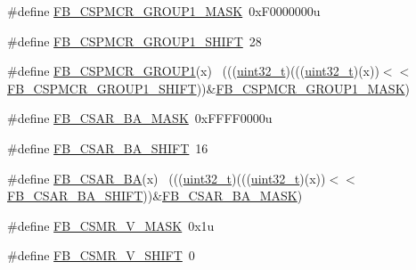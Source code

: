 \begin{DoxyCompactItemize}
\item 
\#define \hyperlink{group___f_b___register___masks_ga735fd2a0040e9ad1122a3c3fc8e28193}{F\+B\+\_\+\+C\+S\+P\+M\+C\+R\+\_\+\+G\+R\+O\+U\+P1\+\_\+\+M\+A\+SK}~0x\+F0000000u
\item 
\#define \hyperlink{group___f_b___register___masks_ga9c83850dcb3efe92a0404101e5afbdca}{F\+B\+\_\+\+C\+S\+P\+M\+C\+R\+\_\+\+G\+R\+O\+U\+P1\+\_\+\+S\+H\+I\+FT}~28
\item 
\#define \hyperlink{group___f_b___register___masks_ga9a5a66bff196c0cdfac5a0b293e5ca6a}{F\+B\+\_\+\+C\+S\+P\+M\+C\+R\+\_\+\+G\+R\+O\+U\+P1}(x)                                        ~(((\hyperlink{_p_e___types_8h_a33594304e786b158f3fb30289278f5af}{uint32\+\_\+t})(((\hyperlink{_p_e___types_8h_a33594304e786b158f3fb30289278f5af}{uint32\+\_\+t})(x))$<$$<$\hyperlink{group___f_b___register___masks_ga9c83850dcb3efe92a0404101e5afbdca}{F\+B\+\_\+\+C\+S\+P\+M\+C\+R\+\_\+\+G\+R\+O\+U\+P1\+\_\+\+S\+H\+I\+FT}))\&\hyperlink{group___f_b___register___masks_ga735fd2a0040e9ad1122a3c3fc8e28193}{F\+B\+\_\+\+C\+S\+P\+M\+C\+R\+\_\+\+G\+R\+O\+U\+P1\+\_\+\+M\+A\+SK})
\item 
\#define \hyperlink{group___f_b___register___masks_ga917335c957f6472faf91ae0b244db487}{F\+B\+\_\+\+C\+S\+A\+R\+\_\+\+B\+A\+\_\+\+M\+A\+SK}~0x\+F\+F\+F\+F0000u
\item 
\#define \hyperlink{group___f_b___register___masks_ga098f6109a1dcc8cc007bca53c312810f}{F\+B\+\_\+\+C\+S\+A\+R\+\_\+\+B\+A\+\_\+\+S\+H\+I\+FT}~16
\item 
\#define \hyperlink{group___f_b___register___masks_ga4241bb44a894dd2be2480feaf7eb2e21}{F\+B\+\_\+\+C\+S\+A\+R\+\_\+\+BA}(x)                                                    ~(((\hyperlink{_p_e___types_8h_a33594304e786b158f3fb30289278f5af}{uint32\+\_\+t})(((\hyperlink{_p_e___types_8h_a33594304e786b158f3fb30289278f5af}{uint32\+\_\+t})(x))$<$$<$\hyperlink{group___f_b___register___masks_ga098f6109a1dcc8cc007bca53c312810f}{F\+B\+\_\+\+C\+S\+A\+R\+\_\+\+B\+A\+\_\+\+S\+H\+I\+FT}))\&\hyperlink{group___f_b___register___masks_ga917335c957f6472faf91ae0b244db487}{F\+B\+\_\+\+C\+S\+A\+R\+\_\+\+B\+A\+\_\+\+M\+A\+SK})
\item 
\#define \hyperlink{group___f_b___register___masks_ga746554e800a78e64f18c333f8b3dbd2c}{F\+B\+\_\+\+C\+S\+M\+R\+\_\+\+V\+\_\+\+M\+A\+SK}~0x1u
\item 
\#define \hyperlink{group___f_b___register___masks_ga62bde86e3e74e677b6cb555c806d1dc3}{F\+B\+\_\+\+C\+S\+M\+R\+\_\+\+V\+\_\+\+S\+H\+I\+FT}~0
\item 

\end{DoxyCompactItemize}
